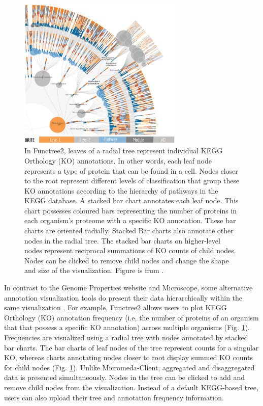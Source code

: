 \begin{figure}[!ht]
  \centering
	\includegraphics[width=0.7\textwidth]{media/functree2.png}
	 \caption{In Functree2, leaves of a radial tree represent individual KEGG Orthology (KO) annotations. In other words, each leaf node represents a type of protein that can be found in a cell. Nodes closer to the root represent different levels of classification that group these KO annotations according to the hierarchy of pathways in the KEGG database. A stacked bar chart annotates each leaf node. This chart possesses coloured bars representing the number of proteins in each organism's proteome with a specific KO annotation. These bar charts are oriented radially. Stacked Bar charts also annotate other nodes in the radial tree. The stacked bar charts on higher-level nodes represent reciprocal summations of KO counts of child nodes. Nodes can be clicked to remove child nodes and change the shape and size of the visualization. Figure is from \cite{darzi2019functree2}.}
	 \label{fig:functree2}
\end{figure}

In contrast to the Genome Properties website and Microscope, some alternative annotation visualization tools do present their data hierarchically within the same visualization \cite{darzi2019functree2}. For example, Functree2 \cite{darzi2019functree2} allows users to plot KEGG Orthology (KO) annotation \cite{mao2005automated,kanehisa2011kegg} frequency (i.e, the number of proteins of an organism that that possess a specific KO annotation) across multiple organisms (Fig. \ref{fig:functree2}). Frequencies are visualized using a radial tree with nodes annotated by stacked bar charts. The bar charts of leaf nodes of the tree represent counts for a singular KO, whereas charts annotating nodes closer to root display summed KO counts for child nodes (Fig. \ref{fig:functree2}). Unlike Micromeda-Client, aggregated and disaggregated data is presented simultaneously. Nodes in the tree can be clicked to add and remove child nodes from the visualization. Instead of a default KEGG-based tree, users can also upload their tree and annotation frequency information.

